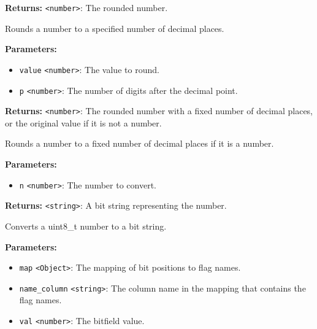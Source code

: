 \documentclass[12pt,a4paper]{article}
\begin{document}
\noindent \textbf{Returns:} \texttt{<number>}: The rounded number.

\noindent Rounds a number to a specified number of decimal places.

\vspace{5mm}
\noindent {}


\noindent \textbf{Parameters:}
\begin{itemize}
  \item \texttt{value} \texttt{<number>}: The value to round.
  \item \texttt{p} \texttt{<number>}: The number of digits after the decimal point.
\end{itemize}

\noindent \textbf{Returns:} \texttt{<number>}: The rounded number with a fixed number of decimal places, or the original value if it is not a number.

\noindent Rounds a number to a fixed number of decimal places if it is a number.

\vspace{5mm}
\noindent {}


\noindent \textbf{Parameters:}
\begin{itemize}
  \item \texttt{n} \texttt{<number>}: The number to convert.
\end{itemize}

\noindent \textbf{Returns:} \texttt{<string>}: A bit string representing the number.

\noindent Converts a uint8\_t number to a bit string.

\vspace{5mm}
\noindent {}


\noindent \textbf{Parameters:}
\begin{itemize}
  \item \texttt{map} \texttt{<Object>}: The mapping of bit positions to flag names.
  \item \texttt{name\_column} \texttt{<string>}: The column name in the mapping that contains the flag names.
  \item \texttt{val} \texttt{<number>}: The bitfield value.
\end{itemize}
\end{document}
